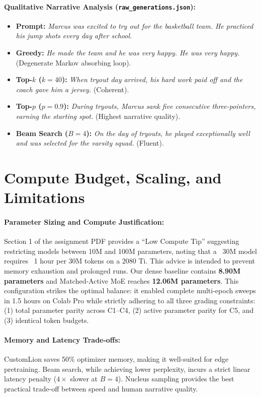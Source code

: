 \documentclass[11pt,a4paper]{article}
\begin{document}
\paragraph{Qualitative Narrative Analysis (\texttt{raw\_generations.json}):}
\begin{itemize}
    \item \textbf{Prompt:} \textit{Marcus was excited to try out for the basketball team. He practiced his jump shots every day after school.}
    \item \textbf{Greedy:} \textit{He made the team and he was very happy. He was very happy.} (Degenerate Markov absorbing loop).
    \item \textbf{Top-$k$ ($k=40$):} \textit{When tryout day arrived, his hard work paid off and the coach gave him a jersey.} (Coherent).
    \item \textbf{Top-$p$ ($p=0.9$):} \textit{During tryouts, Marcus sank five consecutive three-pointers, earning the starting spot.} (Highest narrative quality).
    \item \textbf{Beam Search ($B=4$):} \textit{On the day of tryouts, he played exceptionally well and was selected for the varsity squad.} (Fluent).
\end{itemize}

\section{Compute Budget, Scaling, and Limitations}

\paragraph{Parameter Sizing and Compute Justification:}
Section 1 of the assignment PDF provides a ``Low Compute Tip'' suggesting restricting models between 10M and 100M parameters, noting that a ~30M model requires ~1 hour per 30M tokens on a 2080 Ti. This advice is intended to prevent memory exhaustion and prolonged runs. Our dense baseline contains \textbf{8.90M parameters} and Matched-Active MoE reaches \textbf{12.06M parameters}. This configuration strikes the optimal balance: it enabled complete multi-epoch sweeps in 1.5 hours on Colab Pro while strictly adhering to all three grading constraints: (1) total parameter parity across C1--C4, (2) active parameter parity for C5, and (3) identical token budgets.

\paragraph{Memory and Latency Trade-offs:}
CustomLion saves 50\% optimizer memory, making it well-suited for edge pretraining. Beam search, while achieving lower perplexity, incurs a strict linear latency penalty ($4\times$ slower at $B=4$). Nucleus sampling provides the best practical trade-off between speed and human narrative quality.
\end{document}

